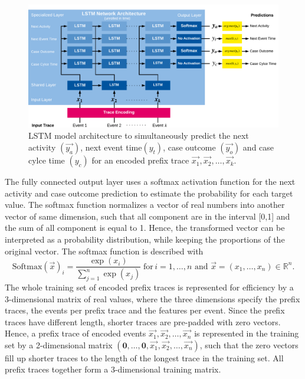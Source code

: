 \begin{figure}[!htbp]
	\centering
	\includegraphics[width=\textwidth]{figures/network}
	\caption[LSTM model architecture for text-aware process prediction]{LSTM model architecture to simultaneously predict the next activity $(\vec{y_a})$, next event time$(y_t)$, case outcome $(\vec{y_o})$ and case cylce time $(y_c)$ for an encoded prefix trace $\vec{x_1}, \vec{x_2}, \dots, \vec{x_k}$.}
	\label{fig:network}
\end{figure}

The fully connected output layer uses a softmax activation function for the next activity and case outcome prediction to estimate the probability for each target value.
The softmax function normalizes a vector of real numbers into another vector of same dimension, such that all component are in the interval [0,1] and the sum of all component is equal to 1.
Hence, the transformed vector can be interpreted as a probability distribution, while keeping the proportions of the original vector.
The softmax function is described with
\begin{equation*}\label{key}
	\text{Softmax}(\vec{x})_i = \frac{\exp(x_i)}{\sum_{j=1}^{n} \exp(x_j)}  \; \text{for} \, i = 1, \dots, n \text{ and } \vec{x}=(x_1, \dots, x_n) \in \mathbb{R}^n.
\end{equation*}
The whole training set of encoded prefix traces is represented for efficiency by a 3-dimensional matrix of real values, where the three dimensions specify the prefix traces, the events per prefix trace and the features per event.
Since the prefix traces have different length, shorter traces are pre-padded \cite{DBLP:journals/corr/abs-1903-07288} with zero vectors.
Hence, a prefix trace of encoded events $\vec{x_1}, \vec{x_2}, \dots, \vec{x_n}$  is represented in the training set by a 2-dimensional matrix $(\mathbf{0}, \dots, \mathbf{0},\vec{x_1}, \vec{x_2}, \dots, \vec{x_n})$, such that the zero vectors fill up shorter traces to the length of the longest trace in the training set.
All prefix traces together form a 3-dimensional training matrix.

